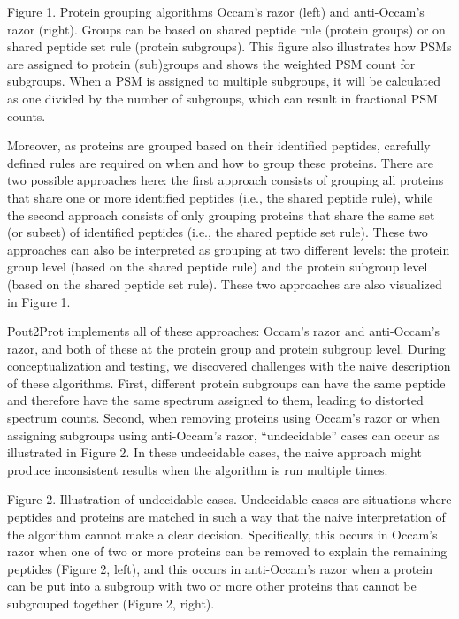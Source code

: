 Figure 1. Protein grouping algorithms Occam's razor (left) and
anti-Occam's razor (right). Groups can be based on shared peptide rule
(protein groups) or on shared peptide set rule (protein subgroups). This
figure also illustrates how PSMs are assigned to protein (sub)groups and
shows the weighted PSM count for subgroups. When a PSM is assigned to
multiple subgroups, it will be calculated as one divided by the number
of subgroups, which can result in fractional PSM counts.

Moreover, as proteins are grouped based on their identified peptides,
carefully defined rules are required on when and how to group these
proteins. There are two possible approaches here: the first approach
consists of grouping all proteins that share one or more identified
peptides (i.e., the shared peptide rule), while the second approach
consists of only grouping proteins that share the same set (or subset)
of identified peptides (i.e., the shared peptide set rule). These two
approaches can also be interpreted as grouping at two different levels:
the protein group level (based on the shared peptide rule) and the
protein subgroup level (based on the shared peptide set rule). These two
approaches are also visualized in Figure 1.

Pout2Prot implements all of these approaches: Occam's razor and
anti-Occam's razor, and both of these at the protein group and protein
subgroup level. During conceptualization and testing, we discovered
challenges with the naive description of these algorithms. First,
different protein subgroups can have the same peptide and therefore have
the same spectrum assigned to them, leading to distorted spectrum
counts. Second, when removing proteins using Occam's razor or when
assigning subgroups using anti-Occam's razor, ``undecidable'' cases can
occur as illustrated in Figure 2. In these undecidable cases, the naive
approach might produce inconsistent results when the algorithm is run
multiple times.

Figure 2. Illustration of undecidable cases. Undecidable cases are
situations where peptides and proteins are matched in such a way that
the naive interpretation of the algorithm cannot make a clear decision.
Specifically, this occurs in Occam's razor when one of two or more
proteins can be removed to explain the remaining peptides (Figure 2,
left), and this occurs in anti-Occam's razor when a protein can be put
into a subgroup with two or more other proteins that cannot be
subgrouped together (Figure 2, right).

